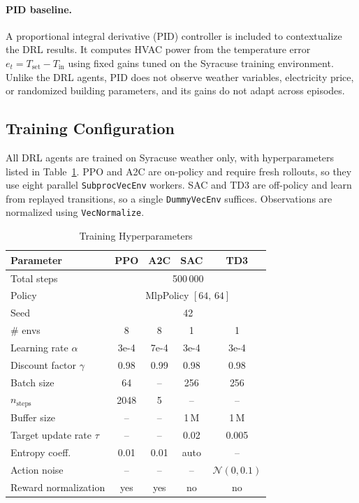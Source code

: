 \documentclass[conference]{IEEEtran}
\begin{document}
\paragraph{PID baseline.}
A proportional integral derivative (PID) controller is included to
contextualize the DRL results. It computes HVAC power from the
temperature error $e_t = T_{\text{set}} - T_{\text{in}}$ using fixed
gains tuned on the Syracuse training environment. Unlike the DRL agents,
PID does not observe weather variables, electricity price, or randomized
building parameters, and its gains do not adapt across episodes.

\subsection{Training Configuration}
\label{subsec:training-config}

All DRL agents are trained on Syracuse weather only, with hyperparameters
listed in Table~\ref{tab:hyperparams}. PPO and A2C are on-policy and
require fresh rollouts, so they use eight parallel
\texttt{SubprocVecEnv} workers. SAC and TD3 are off-policy and learn from
replayed transitions, so a single \texttt{DummyVecEnv} suffices.
Observations are normalized using \texttt{VecNormalize}.

\begin{table}[!t]
\centering
\caption{Training Hyperparameters}
\label{tab:hyperparams}
\begin{tabular}{lcccc}
\toprule
\textbf{Parameter} & \textbf{PPO} & \textbf{A2C} & \textbf{SAC} & \textbf{TD3} \\
\midrule
Total steps                 & \multicolumn{4}{c}{500\,000} \\
Policy                      & \multicolumn{4}{c}{MlpPolicy $[64,\,64]$} \\
Seed                        & \multicolumn{4}{c}{42} \\
\midrule
\# envs                     & 8     & 8     & 1     & 1     \\
Learning rate $\alpha$      & 3e-4  & 7e-4  & 3e-4  & 3e-4  \\
Discount factor $\gamma$    & 0.98  & 0.99  & 0.98  & 0.98  \\
Batch size                  & 64    & --    & 256   & 256   \\
$n_{\text{steps}}$          & 2048  & 5     & --    & --    \\
Buffer size                 & --    & --    & 1\,M  & 1\,M  \\
Target update rate $\tau$   & --    & --    & 0.02  & 0.005 \\
Entropy coeff.              & 0.01  & 0.01  & auto  & --    \\
Action noise                & --    & --    & --    & $\mathcal{N}(0,0.1)$ \\
Reward normalization        & yes   & yes   & no    & no    \\
\bottomrule
\end{tabular}
\end{table}
\end{document}
